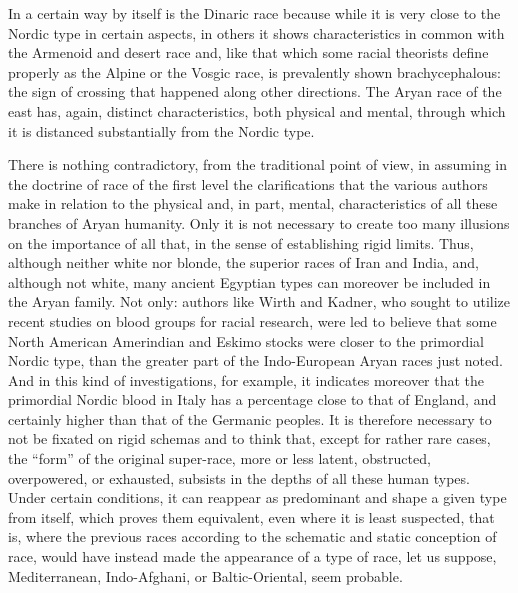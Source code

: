 In a certain way by itself is the Dinaric race because while it is very close to the Nordic type in certain aspects, in others it shows characteristics in common with the Armenoid and desert race and, like that which some racial theorists define properly as the Alpine or the Vosgic race, is prevalently shown brachycephalous: the sign of crossing that happened along other directions. The Aryan race of the east has, again, distinct characteristics, both physical and mental, through which it is distanced substantially from the Nordic type.

There is nothing contradictory, from the traditional point of view, in assuming in the doctrine of race of the first level the clarifications that the various authors make in relation to the physical and, in part, mental, characteristics of all these branches of Aryan humanity. Only it is not necessary to create too many illusions on the importance of all that, in the sense of establishing rigid limits. Thus, although neither white nor blonde, the superior races of Iran and India, and, although not white, many ancient Egyptian types can moreover be included in the Aryan family. Not only: authors like Wirth and Kadner, who sought to utilize recent studies on blood groups for racial research, were led to believe that some North American Amerindian and Eskimo stocks were closer to the primordial Nordic type, than the greater part of the Indo-European Aryan races just noted. And in this kind of investigations, for example, it indicates moreover that the primordial Nordic blood in Italy has a percentage close to that of England, and certainly higher than that of the Germanic peoples. It is therefore necessary to not be fixated on rigid schemas and to think that, except for rather rare cases, the ``form'' of the original super-race, more or less latent, obstructed, overpowered, or exhausted, subsists in the depths of all these human types. Under certain conditions, it can reappear as predominant and shape a given type from itself, which proves them equivalent, even where it is least suspected, that is, where the previous races according to the schematic and static conception of race, would have instead made the appearance of a type of race, let us suppose, Mediterranean, Indo-Afghani, or Baltic-Oriental, seem probable.

